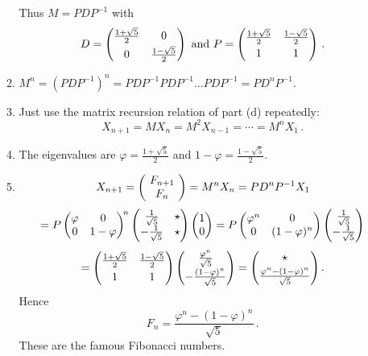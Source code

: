 \begin{enumerate}
\begin{enumerate}
Thus $M=PDP^{-1}$ with $$D=\begin{pmatrix}\frac{1+\sqrt{5}}{2}&\mc0\\[1mm]\mc0&\frac{1-\sqrt{5}}{2}\end{pmatrix} \mbox{ and } P =\begin{pmatrix}\frac{1+\sqrt{5}}{2}&\frac{1-\sqrt{5}}{2}\\[1mm]\mc1&\mc1\end{pmatrix}\, .$$
\item $M^n=(P D P^{-1})^n = P D P^{-1} P D P^{-1} \ldots P D P^{-1} = P D^n P^{-1}$.
\item Just use the matrix recursion relation of part (d) repeatedly: $$X_{n+1}= M X_{n} = M^2 X_{n-1}=\cdots = M^{n} X_1\, .$$
\item The eigenvalues are $\varphi = \frac{1+\sqrt{5}}{2}$ and $1-\varphi = \frac{1-\sqrt{5}}{2}$.
\item $$X_{n+1}=\left(\!\begin{array}{c} F_{n+1}\\F_n \end{array}\!\right)=
M^n X_n = P D^n P^{-1} X_{1}$$ $$=P 
\begin{pmatrix}\varphi&\mc0\\\mc0&1-\varphi\end{pmatrix}^{\!n} 
\begin{pmatrix}\frac{1}{\sqrt{5}}&\star \\-\frac{1}{\sqrt{5}}& \star\end{pmatrix}
\begin{pmatrix}1\\ 0\end{pmatrix}
=P 
\begin{pmatrix}\varphi^n&\mc0\\\mc0&(1-\varphi)^n\end{pmatrix}
\begin{pmatrix}\frac{1}{\sqrt{5}}\\-\frac{1}{\sqrt{5}}\end{pmatrix}
$$
$$
=\begin{pmatrix}\frac{1+\sqrt{5}}{2}&\frac{1-\sqrt{5}}{2}\\[1mm]\mc1&\mc1\end{pmatrix}
\begin{pmatrix}\mc{\frac{\varphi^n}{\sqrt{5}}}\\[1mm]-\frac{(1-\varphi)^n}{\sqrt{5}}\end{pmatrix}
=\begin{pmatrix}\mc\star \\[1mm]\frac{\varphi^n-(1-\varphi)^n}{\sqrt{5}}\end{pmatrix}.
$$
Hence
$$F_n=\frac{\varphi^n-(1-\varphi)^n}{\sqrt{5}}\, .$$
These are the famous Fibonacci numbers.
\end{enumerate}



\end{enumerate}
